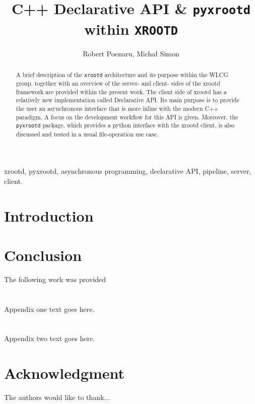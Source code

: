 \documentclass[journal]{IEEEtran}
\begin{document}
\title{C++ Declarative API \& \texttt{pyxrootd}\\within \texttt{XROOTD}}
\author{Robert Poenaru, Michał Simon}

\maketitle

\begin{abstract}
A brief description of the \texttt{xrootd} architecture and its purpose within the WLCG group, together with an overview of the server- and client- sides of the xrootd framework are provided within the present work. The client side of xrootd has a relatively new implementation called Declarative API. Its main purpose is to provide the user an asynchronous interface that is more inline with the modern C++ paradigm. A focus on the development workflow for this API is given. Moreover, the \texttt{pyxrootd} package, which provides a python interface with the xrootd client, is also discussed and tested in a usual file-operation use case.
\end{abstract}

\begin{IEEEkeywords}
xrootd, pyxrootd, asynchronous programming, declarative API, pipeline, server, client.
\end{IEEEkeywords}

\IEEEpeerreviewmaketitle

\section{Introduction}



\section{Conclusion}
The following work was provided

\appendices
\section{}
Appendix one text goes here.

\section{}
Appendix two text goes here.


\section*{Acknowledgment}
The authors would like to thank...

\ifCLASSOPTIONcaptionsoff
  \newpage
\fi

\end{document}
